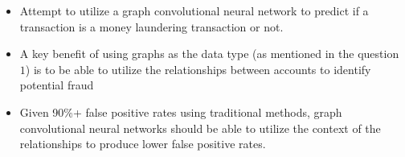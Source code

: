 
\begin{itemize}
    \item{Attempt to utilize a graph convolutional neural network to predict if a transaction is a money laundering transaction or not.}
    \item{A key benefit of using graphs as the data type (as mentioned in the question \(1\)) is to be able to utilize the relationships between accounts to identify potential fraud}
    \item{Given 90\%+ false positive rates using traditional methods, graph convolutional neural networks should be able to utilize the context of the relationships to produce lower false positive rates.}
\end{itemize}